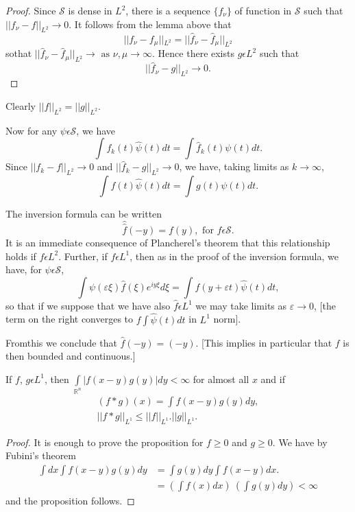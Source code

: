 \begin{proof}
  Since $\mathscr{S}$ is dense in $L^2$, there is a sequence $\{f_\nu
  \}$ of function in $\mathscr{S}$ such that $|| f_\nu - f ||_{L^2}
  \to 0$. It follows from the lemma above that 
  $$
  ||f_\nu - f_\mu||{_{L^2}} = ||\hat{f}_\nu - \hat{f}_\mu||_{L^2}
  $$
  so\pageoriginale that $|| \hat{f}_\nu - \hat{f}_\mu||_{L^2} \to \text{ as } \nu,
  \mu \to \infty$. Hence there exists $g \epsilon L^2$ such that 
  $$
  || \hat{f}_\nu - g||_{L^2} \to 0.
  $$
\end{proof} 
 
Clearly $|| f ||_{L^2} = ||g||_{L^2}$.
 
Now for any $\psi \epsilon \mathscr{S}$, we have
$$
\int f_k (t)\hat{\psi} (t) dt = \int \hat{f}_k (t) \psi (t) dt.
$$
Since $||f_k - f||_{L^2} \to 0$ and $|| \hat{f}_k - g||_{L^2} \to 0$,
we have, taking limits as $k \to \infty$, 
$$
\int f (t) \hat{\psi} (t) dt = \int g(t) \psi (t) dt.
$$

\begin{remark*}%
  The inversion formula can be written
  $$
  \hat{\hat{f}}(-y) = f (y), \text{ for } f \epsilon \mathscr{S}.
  $$
  It is an immediate consequence of Plancherel's theorem that this
  relationship holds if $f \epsilon L^2$. Further, if $f
  \epsilon L^1$, then as in the proof of the inversion formula, we
  have, for $\psi \epsilon \mathscr{S}$, 
  $$
  \int \psi (\varepsilon \xi)\hat{f} (\xi) e^{iy \xi} d \xi = \int f
  (y + \varepsilon t) \hat{\psi} (t) dt, 
  $$
  so that if we suppose that we have also $\hat{f} \epsilon L^1$ we
  may take limits as $\varepsilon \to 0$, [the term on the right
    converges to $f \int \hat{\psi} (t) dt$ in $L^1$ norm]. 
\end{remark*} 

From\pageoriginale this we conclude that $ \hat f (- y) = (- y)$. [This implies in
  particular that $f$ is then bounded and continuous.]

\begin{proposition}\label{chap3:sec4:prop2}%
  If $f$, $g \epsilon L^1$, then $\int\limits_{\mathbb{R}^n } | f
  (x - y ) g (y )|dy < \infty $ for almost all $x$  and if  
  \begin{gather*}
    (f * g ) (x ) = \int  f (x - y )g (y ) dy,\\
    || f * g ||_{L^1} \leq || f ||_{L^1} . || g ||_{L^1}.
  \end{gather*}
\end{proposition}

\begin{proof}
  It is enough to prove the proposition for $f \ge 0$ and $g \ge
  0$. We have by Fubini's theorem  
  \begin{align*}
    \int dx \int f (x - y ) g (y ) dy & = \int g (y ) dy \int f (x - y ) dx. \\
    & = \left(\int f (x) dx \right) ~\left(\int g (y) dy \right) < \infty
  \end{align*}
  and the proposition follows. 
\end{proof}

